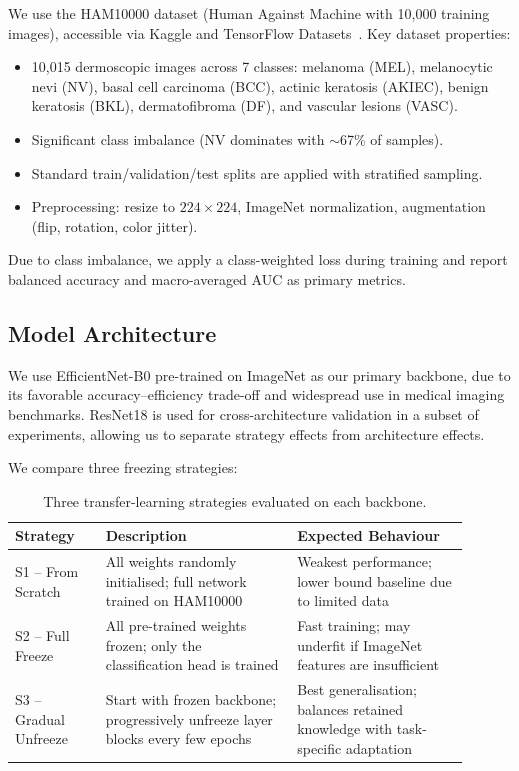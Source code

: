 \documentclass{article}
\begin{document}
We use the HAM10000 dataset (Human Against Machine with 10{,}000 training
images), accessible via Kaggle and TensorFlow
Datasets~\cite{tschandl2018ham10000}. Key dataset properties:

\begin{itemize}
  \item 10{,}015 dermoscopic images across 7 classes: melanoma (MEL),
  melanocytic nevi (NV), basal cell carcinoma (BCC), actinic keratosis
  (AKIEC), benign keratosis (BKL), dermatofibroma (DF), and vascular lesions
  (VASC).
  \item Significant class imbalance (NV dominates with $\sim$67\% of samples).
  \item Standard train/validation/test splits are applied with stratified
  sampling.
  \item Preprocessing: resize to $224\times224$, ImageNet normalization,
  augmentation (flip, rotation, color jitter).
\end{itemize}

Due to class imbalance, we apply a class-weighted loss during training and
report balanced accuracy and macro-averaged AUC as primary metrics.

\subsection{Model Architecture}

We use EfficientNet-B0 pre-trained on ImageNet as our primary backbone, due
to its favorable accuracy--efficiency trade-off and widespread use in medical
imaging benchmarks. ResNet18 is used for cross-architecture validation in a
subset of experiments, allowing us to separate strategy effects from
architecture effects.

We compare three freezing strategies:

\begin{table}[h]
\centering
\caption{Three transfer-learning strategies evaluated on each backbone.}
\label{tab:strategies}
\begin{tabular}{|p{0.18\linewidth}|p{0.38\linewidth}|p{0.34\linewidth}|}
\hline
\textbf{Strategy} & \textbf{Description} & \textbf{Expected Behaviour} \\
\hline
\rowcolor{tableGrey}
S1 -- From Scratch &
All weights randomly initialised; full network trained on HAM10000 &
Weakest performance; lower bound baseline due to limited data \\
\hline
S2 -- Full Freeze &
All pre-trained weights frozen; only the classification head is trained &
Fast training; may underfit if ImageNet features are insufficient \\
\hline
\rowcolor{tableGrey}
S3 -- Gradual Unfreeze &
Start with frozen backbone; progressively unfreeze layer blocks every few
epochs &
Best generalisation; balances retained knowledge with task-specific
adaptation \\
\hline
\end{tabular}
\end{table}
\end{document}
